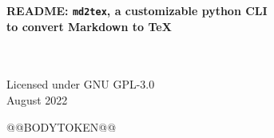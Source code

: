\documentclass[a4paper, 12pt, twoside]{@@DOCUMENTCLASSTOKEN@@}
\begin{document}
\begin{center}
	\begin{Large}
        \textbf{README: \texttt{md2tex}, a customizable python CLI \\ to convert Markdown to TeX}
    \end{Large}
    \bigskip
    \\~\\Licensed under GNU GPL-3.0\\August 2022
	\vspace{1.5cm}
\end{center}

@@BODYTOKEN@@

\clearpage
\tableofcontents
\end{document}
